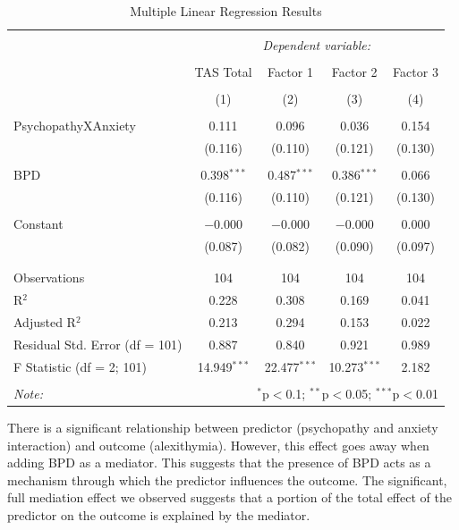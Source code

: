 \documentclass[
  man,floatsintext]{apa6}
\begin{document}
\begin{table}[!htbp] \centering 
  \caption{Multiple Linear Regression Results} 
  \label{} 
\begin{tabular}{@{\extracolsep{1pt}}lcccc} 
\\[-1.8ex]\hline 
\hline \\[-1.8ex] 
 & \multicolumn{4}{c}{\textit{Dependent variable:}} \\ 
\cline{2-5} 
\\[-1.8ex] & TAS Total & Factor 1 & Factor 2 & Factor 3 \\ 
\\[-1.8ex] & (1) & (2) & (3) & (4)\\ 
\hline \\[-1.8ex] 
 PsychopathyXAnxiety & 0.111 & 0.096 & 0.036 & 0.154 \\ 
  & (0.116) & (0.110) & (0.121) & (0.130) \\ 
  & & & & \\ 
 BPD & 0.398$^{***}$ & 0.487$^{***}$ & 0.386$^{***}$ & 0.066 \\ 
  & (0.116) & (0.110) & (0.121) & (0.130) \\ 
  & & & & \\ 
 Constant & $-$0.000 & $-$0.000 & $-$0.000 & 0.000 \\ 
  & (0.087) & (0.082) & (0.090) & (0.097) \\ 
  & & & & \\ 
\hline \\[-1.8ex] 
Observations & 104 & 104 & 104 & 104 \\ 
R$^{2}$ & 0.228 & 0.308 & 0.169 & 0.041 \\ 
Adjusted R$^{2}$ & 0.213 & 0.294 & 0.153 & 0.022 \\ 
Residual Std. Error (df = 101) & 0.887 & 0.840 & 0.921 & 0.989 \\ 
F Statistic (df = 2; 101) & 14.949$^{***}$ & 22.477$^{***}$ & 10.273$^{***}$ & 2.182 \\ 
\hline 
\hline \\[-1.8ex] 
\textit{Note:}  & \multicolumn{4}{r}{$^{*}$p$<$0.1; $^{**}$p$<$0.05; $^{***}$p$<$0.01} \\ 
\end{tabular} 
\end{table}

There is a significant relationship between predictor (psychopathy and anxiety interaction) and outcome (alexithymia). However, this effect goes away when adding BPD as a mediator. This suggests that the presence of BPD acts as a mechanism through which the predictor influences the outcome. The significant, full mediation effect we observed suggests that a portion of the total effect of the predictor on the outcome is explained by the mediator.
\end{document}
